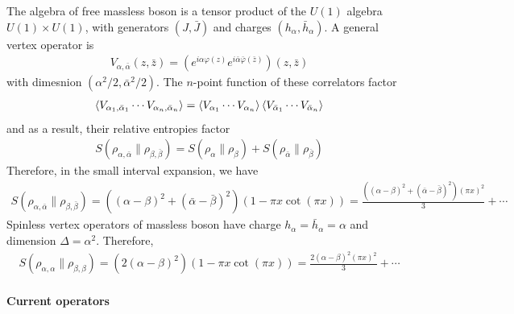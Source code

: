 \documentclass[11pt]{article}
\begin{document}
  The algebra of free massless boson is a tensor product of the $U(1)$ algebra $U(1)\times U(1)$, with generators $(J,\bar{J})$ and charges $(h_\alpha,\bar{h}_\alpha)$. A general vertex operator is
  \begin{align}
    V_{\alpha,\bar{\alpha}}(z,\bar{z})=(e^{i\alpha \varphi(z)}e^{i\bar{\alpha}\bar{\varphi}(\bar{z})})(z,\bar{z})
  \end{align}
  with dimesnion $(\alpha^2/2,\bar{\alpha}^2/2)$. The $n$-point function of these correlators factor 
  \begin{align}
    \braket{V_{\alpha_1,\bar{\alpha}_1}\cdots V_{\alpha_n,\bar{\alpha}_n}}=\braket{V_{\alpha_1}\cdots V_{\alpha_n}}\braket{V_{\bar{\alpha}_1}\cdots V_{\bar{\alpha}_n}}
  \end{align}
  and as a result, their relative entropies factor
  \begin{align}
  S(\rho_{\alpha,\bar{\alpha}}\|\rho_{\beta,\bar{\beta}})=S(\rho_{\alpha}\|\rho_{\beta})+S(\rho_{\bar{\alpha}}\|\rho_{\bar{\beta}})
  \end{align}
  Therefore, in the small interval expansion, we have
  \begin{align}\label{smallxCoherentstates}
\boxed{S(\rho_{\alpha,\bar{\alpha}}\|\rho_{\beta,\bar{\beta}})=((\alpha-\beta)^2+(\bar{\alpha}-\bar{\beta})^2)(1-\pi x\cot(\pi x))=\frac{((\alpha-\beta)^2+(\bar{\alpha}-\bar{\beta})^2)(\pi x)^2}{3}+\cdots}
  \end{align}
  Spinless vertex operators of massless boson have charge $h_\alpha=\bar{h}_\alpha=\alpha$ and dimension $\Delta=\alpha^2$. Therefore,
  \begin{align}
  S(\rho_{\alpha,\alpha}\|\rho_{\beta,\beta})=(2(\alpha-\beta)^2)(1-\pi x\cot(\pi x))=\frac{2(\alpha-\beta)^2(\pi x)^2}{3}+\cdots
  \end{align}

  \paragraph{Current operators}
\end{document}
